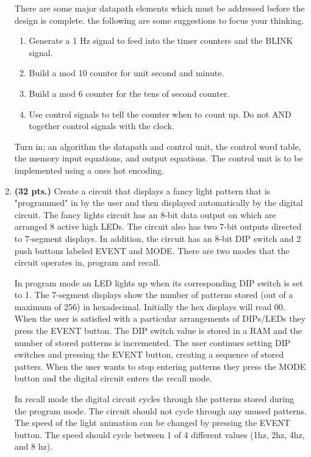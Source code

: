 \begin{enumerate}
There are some major datapath elements which must be addressed
before the design is complete.  the following are some suggestions
to focus your thinking.
\begin{enumerate}
\item Generate a 1 Hz signal to feed into the timer counters
and the BLINK signal.
\item Build a mod 10 counter for unit second and minute.
\item Build a mod 6 counter for the tens of second counter.
\item Use control signals to tell the counter when to count
up.  Do not AND together control signals with the clock.
\end{enumerate}

Turn in; an algorithm
the datapath and control unit,
the control word table,
the memory input equations, and
output equations.
The control unit is to be implemented using a ones hot encoding.


\item{\bf (32 pts.)} Create a circuit that displays a fancy light 
pattern that is "programmed" in by the user and then displayed
automatically by the digital circuit.  The fancy lights circuit
has an 8-bit data output on which are arranged 8 active high LEDs.
The circuit also has two 7-bit outputs directed to 7-segment
displays.  In addition, the circuit has an 8-bit DIP switch and 2 
push buttons labeled EVENT and MODE.  There are two modes that the 
circuit operates in, program and recall.

In program mode an LED lights up when its corresponding DIP switch
is set to 1.   The 7-segment displays show the number of patterns
stored (out of a maximum of 256) in hexadecimal.  Initially
the hex displays will read 00.  When the user is satisfied with a 
particular arrangements of DIPs/LEDs they press the EVENT button.
The DIP switch value is stored in a RAM and the number of stored patterns
is incremented.  The user continues setting DIP switches and pressing
the EVENT button, creating a sequence of stored patters.  When the
user wants to stop entering patterns they press the MODE button and
the digital circuit enters the recall mode.

In recall mode the digital circuit cycles through the patterns
stored during the program mode.  The circuit should not cycle 
through any unused patterns.  The speed of the light animation
can be changed by pressing the EVENT button.  The speed should
cycle between 1 of 4 different values (1hz, 2hz, 4hz, and 8 hz).


\end{enumerate}
